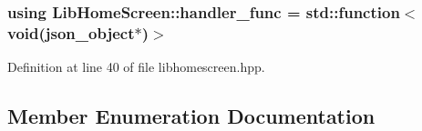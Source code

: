 \subsubsection[{\texorpdfstring{handler\+\_\+func}{handler_func}}]{\setlength{\rightskip}{0pt plus 5cm}using {\bf Lib\+Home\+Screen\+::handler\+\_\+func} =  std\+::function$<$void(json\+\_\+object$\ast$)$>$}\hypertarget{class_lib_home_screen_a334f11f81c84c98d18284215dcaada3a}{}\label{class_lib_home_screen_a334f11f81c84c98d18284215dcaada3a}


Definition at line 40 of file libhomescreen.\+hpp.



\subsection{Member Enumeration Documentation}
